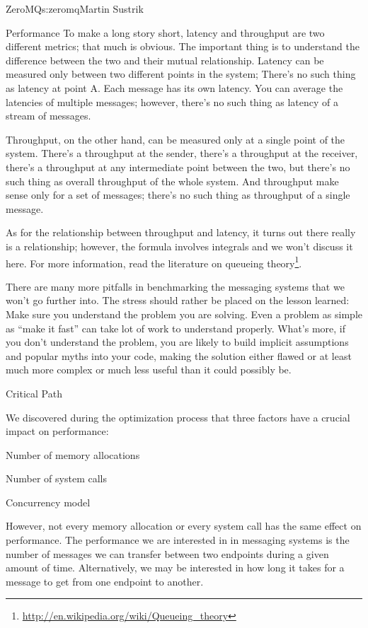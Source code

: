 \begin{aosachapter}{ZeroMQ}{s:zeromq}{Martin Sustrik}
\begin{aosasect1}{Performance}
To make a long story short, latency and throughput are two different
metrics; that much is obvious. The important thing is to understand
the difference between the two and their mutual relationship. Latency
can be measured only between two different points in the
system; There's no such thing as latency at point A. Each message has
its own latency. You can average the latencies of multiple messages;
however, there's no such thing as latency of a stream of
messages. 

Throughput, on the other hand, can be measured only at a
single point of the system. There's a throughput at the sender,
there's a throughput at the receiver, there's a throughput at any
intermediate point between the two, but there's no such thing as
overall throughput of the whole system. And throughput make sense only for
a set of messages; there's no such thing as throughput of a single
message.

As for the relationship between throughput and latency, it turns out
there really is a relationship; however, the formula involves
integrals and we won't discuss it here. For more information, read the
literature on queueing
theory\footnote{\url{http://en.wikipedia.org/wiki/Queueing_theory}}.

There are many more pitfalls in benchmarking the messaging systems
that we won't go further into. The stress should rather be placed on
the lesson learned: Make sure you understand the problem you are
solving. Even a problem as simple as ``make it fast'' can take lot of
work to understand properly. What's more, if you don't understand the
problem, you are likely to build implicit assumptions and popular
myths into your code, making the solution either flawed or at least
much more complex or much less useful than it could possibly be.

\end{aosasect1}

\begin{aosasect1}{Critical Path}

We discovered during the optimization process that three factors have a crucial
impact on performance:

\begin{aosaitemize}
\item Number of memory allocations
\item Number of system calls
\item Concurrency model
\end{aosaitemize}

However, not every memory
allocation or every system call has the same effect on 
performance.  
The performance we are interested in in messaging systems is the number of
messages we can transfer between two endpoints during a given amount
of time. Alternatively, we may be interested in how long it takes for
a message to get from one endpoint to another.


\end{aosasect1}
\end{aosachapter}
